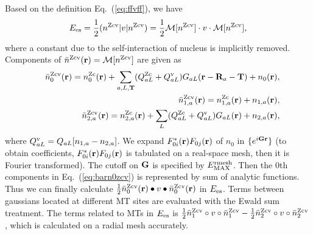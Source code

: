 \documentclass[a4paper,10pt,aip,onecolumn,amsmath,amssymb,floatfix,rmp]{revtex4-1}
\newcommand{\bfr}{{\bf r}}
\newcommand{\bfT}{{\bf T}}
\newcommand{\bfG}{{\bf G}}
\newcommand{\bfR}{{\bf R}}
\newcommand{\req}[1]{\mbox{Eq.~\!(\ref{#1})}}
\def\EMAXm{ E^{\rm rmesh}_{\rm MAX} }
\def\EMAXm{ E^{\rm rmesh}_{\rm MAX} }
\def\nc{n^{\rm c}}
\def\nzc{n^{\rm Zc}}
\def\nzcv{n^{\rm Zcv}}
\def\barnzcv{\bar{n}^{\rm Zcv}}
\def\MM{{\cal M}}
\def\RR{v}
\def\rhoij{\rho_{ij}}
\begin{document}
\begin{widetext}
\begin{widetext}
Based on the definition \req{eq:ffvff}, we have
\begin{eqnarray}
E_{\rm es}= \frac{1}{2} (\nzcv|v|\nzcv)=\frac{1}{2} \MM[\nzcv] \cdot v \cdot \MM[\nzcv],
\label{eq:es}
\end{eqnarray}
where a constant due to the self-interaction of nucleus is implicitly
removed. 
Components of $\barnzcv(\bfr)=\MM[\nzcv]$ are given as
\begin{eqnarray}
&&\barnzcv_0(\bfr)= \nzc_{0}(\bfr)
+ \sum_{a,L,\bfT} 
(Q_{aL}^{\rm Zc}+Q^{\rm v}_{aL})G_{aL}(\bfr-\bfR_a-\bfT)+ n_0(\bfr),
\label{eq:barn0zcv}\\
&&\barnzcv_{1,a}(\bfr)=\nzc_{1,a}(\bfr) +n_{1,a}(\bfr), \label{eq:barn1zcv}\\
&&\barnzcv_{2,a}(\bfr)=\nzc_{2,a}(\bfr) 
+\sum_L (Q_{aL}^{\rm Zc}+Q^{\rm v}_{aL})G_{aL}(\bfr)+n_{2,a}(\bfr),\label{eq:barn2zcv}
\end{eqnarray}
where $Q^{\rm v}_{aL}=Q_{aL}[n_{1,a}-n_{2,a}]$.  We expand
$F^*_{0i}(\bfr)F_{0j}(\bfr)$ of $n_0$ in $\{e^{i \bfG \bfr}\}$ (to
obtain coefficients, $F^*_{0i}(\bfr)F_{0j}(\bfr)$ is tabulated on a
real-space mesh, then it is Fourier transformed).  The cutoff on $\bfG$
is specified by $\EMAXm$.  Then the 0th components in \req{eq:barn0zcv}
is represented by sum of analytic functions. Thus we can finally
calculate $\frac{1}{2} \barnzcv_0(\bfr) \bullet v \bullet
\barnzcv_0(\bfr)$ in $E_{\rm es}$.  Terms between gaussians located at
different MT sites are evaluated with the Ewald sum treatment.  The
terms related to MTs in $E_{\rm es}$ is $ \frac{1}{2} \barnzcv_1 \circ
\RR \circ \barnzcv_1 - \frac{1}{2} \barnzcv_2 \circ \RR \circ
\barnzcv_2$, which is calculated on a radial mesh accurately.


\end{widetext}
\end{widetext}
\end{document}
